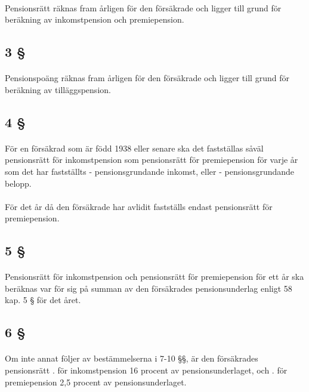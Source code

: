\documentclass[a4paper,notitlepage,openany,10pt]{book}
\begin{document}
\paragraph*{}
Pensionsrätt räknas fram årligen för den försäkrade och ligger till grund för beräkning av inkomstpension och premiepension.
\subsection*{3 §}
\paragraph*{}
Pensionspoäng räknas fram årligen för den försäkrade och ligger till grund för beräkning av tilläggspension.
\subsection*{4 §}
\paragraph*{}
För en försäkrad som är född 1938 eller senare ska det fastställas såväl pensionsrätt för inkomstpension som pensionsrätt för premiepension för varje år som det har fastställts
\newline - pensionsgrundande inkomst, eller
\newline - pensionsgrundande belopp.
\paragraph*{}
För det år då den försäkrade har avlidit fastställs endast pensionsrätt för premiepension.
\subsection*{5 §}
\paragraph*{}
Pensionsrätt för inkomstpension och pensionsrätt för premiepension för ett år ska beräknas var för sig på summan av den försäkrades pensionsunderlag enligt 58 kap. 5 § för det året.
\subsection*{6 §}
\paragraph*{}
Om inte annat följer av bestämmelserna i 7-10 §§, är den försäkrades pensionsrätt
. för inkomstpension 16 procent av pensionsunderlaget, och
. för premiepension 2,5 procent av pensionsunderlaget.
\end{document}
